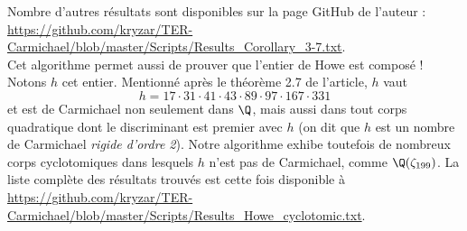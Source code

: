Nombre d'autres résultats sont disponibles sur la page GitHub de l'auteur : \url{https://github.com/kryzar/TER-Carmichael/blob/master/Scripts/Results_Corollary_3-7.txt}. \\

Cet algorithme permet aussi de prouver que l'entier de Howe est composé ! Notons $h$ cet entier. Mentionné après le théorème 2.7 de l'article, $h$ vaut $$h = 17 \cdot 31 \cdot 41 \cdot 43 \cdot 89 \cdot 97 \cdot 167 \cdot 331$$ et est de Carmichael non seulement dans $\Q$, mais aussi dans tout corps quadratique dont le discriminant est premier avec $h$ (on dit que $h$ est un nombre de Carmichael \emph{rigide d'ordre 2}). Notre algorithme exhibe toutefois de nombreux corps cyclotomiques dans lesquels $h$ n'est pas de Carmichael, comme $\Q(\zeta_{199})$. La liste complète des résultats trouvés est cette fois disponible à \url{https://github.com/kryzar/TER-Carmichael/blob/master/Scripts/Results_Howe_cyclotomic.txt}.
